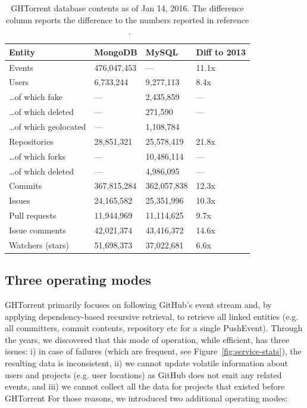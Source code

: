 \documentclass{sig-alternate}
\begin{document}
\begin{table}
  \centering
  \begin{small}
  \label{tab:datasetsize}
  \begin{tabular}{llll}
    \hline
    \bfseries{Entity} & \bfseries{MongoDB} & \bfseries{MySQL} & \bfseries{Diff to 2013} \\
    \hline
      Events                     & 476,047,453 & ---           & 11.1x\\
      Users                      & 6,733,244   & 9,277,113     & 8.4x \\
      \ldots of which fake       & ---         & 2,435,859     & ---\\
      \ldots of which deleted    & ---         & 271,590       & ---\\
      \ldots of which geolocated & ---         & 1,108,784     & \\
      Repositories               & 28,851,321  & 25,578,419    & 21.8x\\
      \ldots of which forks      & ---         & 10,486,114    & --- \\
      \ldots of which deleted    & ---         & 4,986,095     & ---\\
      Commits                    & 367,815,284 & 362,057,838   & 12.3x \\
      Issues                     & 24,165,582  & 25,351,996    & 10.3x \\
      Pull requests              & 11,944,969  & 11,114,625    & 9.7x \\
      Issue comments             & 42,021,374  & 43,416,372    & 14.6x\\
      Watchers (stars)           & 51,698,373  & 37,022,681    & 6.6x\\
      \hline
  \end{tabular}
    \caption{GHTorrent database contents as of Jan 14, 2016. The difference column reports the difference to the numbers reported in reference ~\cite{Gousi13}.}
  \end{small}
\end{table}

\subsection{Three operating modes}

GHTorrent primarily focuses on following GitHub's event stream and, by applying
dependency-based recursive retrieval, to retrieve all linked entities (e.g.  all
committers, commit contents, repository etc for a single PushEvent).
Through the years, we discovered that this mode of operation, while efficient,
has three issues: i) in case of failures (which are frequent, see
Figure~\ref{fig:service-stats}), the resulting data is inconsistent,
ii) we cannot update volatile information about users and projects (e.g. user
locations) as GitHub does not emit any related events, and
iii) we cannot collect all the data for projects that existed before GHTorrent
For those reasons, we introduced two additional operating modes:
\end{document}
